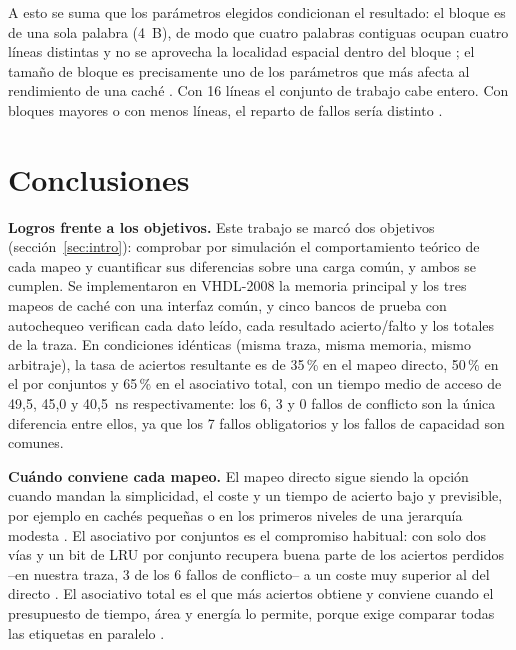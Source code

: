 \documentclass[llncs]{llncs}
\begin{document}
A esto se suma que los parámetros elegidos condicionan el resultado: el
bloque es de una sola palabra (4~B), de modo que cuatro palabras
contiguas ocupan cuatro líneas distintas y no se aprovecha la localidad
espacial dentro del bloque \cite{bryant2015,wikipedia-locality,lam1991}; el
tamaño de bloque es precisamente uno de los parámetros que más afecta al
rendimiento de una caché \cite{smith1987}. Con
16 líneas el conjunto de trabajo cabe entero. Con bloques mayores o con
menos líneas, el reparto de fallos sería distinto
\cite{bryant2015,patterson2017}.

\section{Conclusiones}
\label{sec:conclusiones}

\textbf{Logros frente a los objetivos.} Este trabajo se marcó dos
objetivos (sección~\ref{sec:intro}): comprobar por simulación el
comportamiento teórico de cada mapeo y cuantificar sus diferencias
sobre una carga común, y ambos se cumplen. Se implementaron en
VHDL-2008 la memoria principal y
los tres mapeos de caché con una interfaz común, y cinco bancos de
prueba con autochequeo verifican cada dato leído, cada resultado
acierto/falto y los totales de la traza. En condiciones idénticas
(misma traza, misma memoria, mismo arbitraje), la tasa de aciertos
resultante es de 35\,\% en el mapeo directo, 50\,\% en el por conjuntos
y 65\,\% en el asociativo total, con un tiempo medio de acceso de 49,5,
45,0 y 40,5~ns respectivamente: los 6, 3 y 0 fallos de conflicto son la
única diferencia entre ellos, ya que los 7 fallos obligatorios y los
fallos de capacidad son comunes.

\textbf{Cuándo conviene cada mapeo.} El mapeo directo sigue siendo la
opción cuando mandan la simplicidad, el coste y un tiempo de acierto
bajo y previsible, por ejemplo en cachés pequeñas o en los primeros
niveles de una jerarquía modesta \cite{stallings2019,null2024}. El
asociativo por conjuntos es el compromiso habitual: con solo dos vías y
un bit de LRU por conjunto recupera buena parte de los aciertos
perdidos --en nuestra traza, 3 de los 6 fallos de conflicto-- a un
coste muy superior al del directo \cite{hennessy2019,wikipedia-cpu-cache}.
El asociativo total es el que más aciertos obtiene y conviene cuando el
presupuesto de tiempo, área y energía lo permite, porque exige
comparar todas las etiquetas en paralelo \cite{hennessy2019}.
\end{document}
